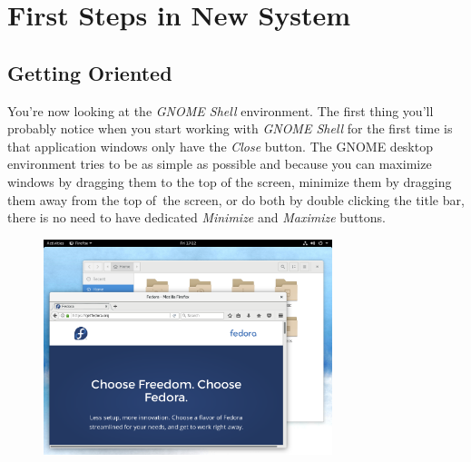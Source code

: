 \chapter*{First Steps in New System}
\section*{Getting Oriented}

You're now looking at the \emph{GNOME Shell} environment. The first thing you'll probably notice when you start working with \emph{GNOME Shell} for the first time is that application windows only have the \emph{Close} button. The GNOME desktop environment tries to be as simple as possible and because you can maximize windows by dragging them to the top of the screen, minimize them by dragging them away from the top of~the screen, or do both by double clicking the title bar, there is no need to have dedicated \emph{Minimize} and \emph{Maximize} buttons.

\bigskip

\begin{figure}[htbp]
\begin{center}
\includegraphics[width=0.75\textwidth]{img/shell-a}
 \label{fig:shell-a}
\end{center}
\end{figure}


